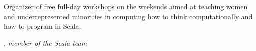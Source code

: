 \documentclass[9pt]{article}
\begin{document}
\bigskip
{}


\newline\noindent Organizer of free full-day workshops on the weekends aimed at teaching women
\newline\noindent and underrepresented minorities in computing how to think computationally and
\newline\noindent how to program in Scala.
\smallskip
\newline{}
\bigskip

\medskip
{}

\vspace{0.01in}
, {\em member of the Scala team} 
\end{document}
